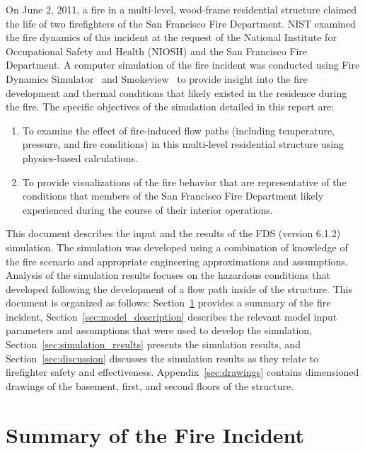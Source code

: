 \documentclass[12pt,oneside]{book}
\begin{document}
On June 2, 2011, a fire in a multi-level, wood-frame residential structure claimed the life of two firefighters of the San Francisco Fire Department. NIST examined the fire dynamics of this incident at the request of the National Institute for Occupational Safety and Health (NIOSH) and the San Francisco Fire Department. A computer simulation of the fire incident was conducted using Fire Dynamics Simulator~\cite{FDS_Users_Guide} and Smokeview~\cite{Smokeview_Users_Guide} to provide insight into the fire development and thermal conditions that likely existed in the residence during the fire. The specific objectives of the simulation detailed in this report are:
\begin{enumerate}
\item To examine the effect of fire-induced flow paths (including temperature, pressure, and fire conditions) in this multi-level residential structure using physics-based calculations.
\item To provide visualizations of the fire behavior that are representative of the conditions that members of the San Francisco Fire Department likely experienced during the course of their interior operations.
\end{enumerate}
This document describes the input and the results of the FDS (version 6.1.2) simulation. The simulation was developed using a combination of knowledge of the fire scenario and appropriate engineering approximations and assumptions. Analysis of the simulation results focuses on the hazardous conditions that developed following the development of a flow path inside of the structure. This document is organized as follows: Section~\ref{sec:incident_summary} provides a summary of the fire incident, Section~\ref{sec:model_description} describes the relevant model input parameters and assumptions that were used to develop the simulation, Section~\ref{sec:simulation_results} presents the simulation results, and Section~\ref{sec:discussion} discusses the simulation results as they relate to firefighter safety and effectiveness. Appendix~\ref{sec:drawings} contains dimensioned drawings of the basement, first, and second floors of the structure.


\chapter{Summary of the Fire Incident}
\label{sec:incident_summary}
\end{document}
